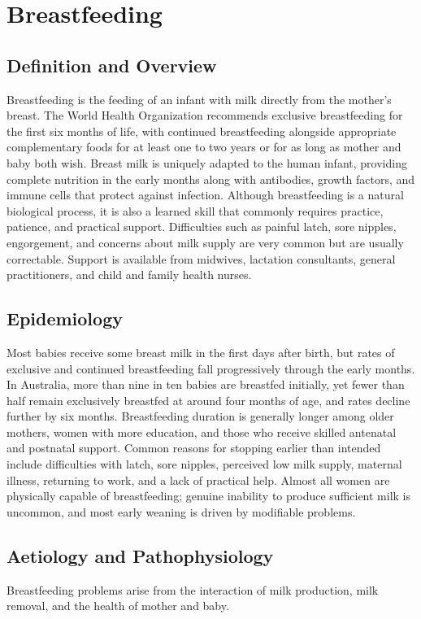 \chapter{Breastfeeding}

\section*{Definition and Overview}
Breastfeeding is the feeding of an infant with milk directly from the mother's breast. The World Health Organization recommends exclusive breastfeeding for the first six months of life, with continued breastfeeding alongside appropriate complementary foods for at least one to two years or for as long as mother and baby both wish. Breast milk is uniquely adapted to the human infant, providing complete nutrition in the early months along with antibodies, growth factors, and immune cells that protect against infection. Although breastfeeding is a natural biological process, it is also a learned skill that commonly requires practice, patience, and practical support. Difficulties such as painful latch, sore nipples, engorgement, and concerns about milk supply are very common but are usually correctable. Support is available from midwives, lactation consultants, general practitioners, and child and family health nurses.

\section*{Epidemiology}
Most babies receive some breast milk in the first days after birth, but rates of exclusive and continued breastfeeding fall progressively through the early months. In Australia, more than nine in ten babies are breastfed initially, yet fewer than half remain exclusively breastfed at around four months of age, and rates decline further by six months. Breastfeeding duration is generally longer among older mothers, women with more education, and those who receive skilled antenatal and postnatal support. Common reasons for stopping earlier than intended include difficulties with latch, sore nipples, perceived low milk supply, maternal illness, returning to work, and a lack of practical help. Almost all women are physically capable of breastfeeding; genuine inability to produce sufficient milk is uncommon, and most early weaning is driven by modifiable problems.

\section*{Aetiology and Pathophysiology}
Breastfeeding problems arise from the interaction of milk production, milk removal, and the health of mother and baby.


